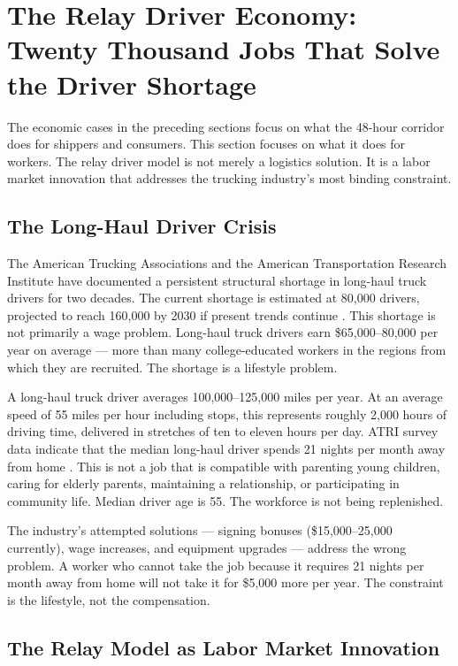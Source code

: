 \section{The Relay Driver Economy: Twenty Thousand Jobs That Solve the Driver Shortage}
\label{sec:relay}

The economic cases in the preceding sections focus on what the 48-hour corridor does for
shippers and consumers. This section focuses on what it does for workers. The relay driver
model is not merely a logistics solution. It is a labor market innovation that addresses
the trucking industry's most binding constraint.

\subsection{The Long-Haul Driver Crisis}

The American Trucking Associations and the American Transportation Research Institute have
documented a persistent structural shortage in long-haul truck drivers for two decades.
The current shortage is estimated at 80,000 drivers, projected to reach 160,000 by 2030
if present trends continue \citep{ATRI_shortage2024}. This shortage is not primarily
a wage problem. Long-haul truck drivers earn \$65,000--80,000 per year on average ---
more than many college-educated workers in the regions from which they are recruited.
The shortage is a lifestyle problem.

A long-haul truck driver averages 100,000--125,000 miles per year. At an average speed
of 55 miles per hour including stops, this represents roughly 2,000 hours of driving time,
delivered in stretches of ten to eleven hours per day. ATRI survey data indicate that
the median long-haul driver spends 21 nights per month away from home \citep{ATRI_shortage2024}.
This is not a job that is compatible with parenting young children, caring for elderly
parents, maintaining a relationship, or participating in community life. Median driver
age is 55. The workforce is not being replenished.

The industry's attempted solutions --- signing bonuses (\$15,000--25,000 currently),
wage increases, and equipment upgrades --- address the wrong problem. A worker who
cannot take the job because it requires 21 nights per month away from home will not
take it for \$5,000 more per year. The constraint is the lifestyle, not the compensation.

\subsection{The Relay Model as Labor Market Innovation}

